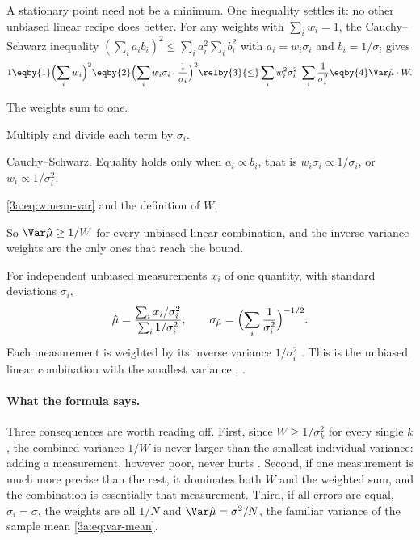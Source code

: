 A stationary point need not be a minimum. One inequality settles it: no
other unbiased linear recipe does better. For any weights with
$\sum_iw_i=1$, the Cauchy--Schwarz inequality
$(\sum_ia_ib_i)^2\le\sum_ia_i^2\sum_ib_i^2$ with $a_i=w_i\sigma_i$ and
$b_i=1/\sigma_i$ gives
\begin{equation}
  1 \eqby{1} \Bigl(\sum_i w_i\Bigr)^2
    \eqby{2} \Bigl(\sum_i w_i\sigma_i\cdot\frac{1}{\sigma_i}\Bigr)^2
    \relby{3}{\le} \sum_iw_i^2\sigma_i^2\;\sum_i\frac{1}{\sigma_i^2}
    \eqby{4} \Var\hat\mu\cdot W .
  \label{3a:eq:wmean-cs}
\end{equation}
\begin{explain}
  \item The weights sum to one.
  \item Multiply and divide each term by $\sigma_i$.
  \item Cauchy--Schwarz. Equality holds only when $a_i\propto b_i$, that is
        $w_i\sigma_i\propto1/\sigma_i$, or $w_i\propto1/\sigma_i^2$.
  \item \eqref{3a:eq:wmean-var} and the definition of $W$.
\end{explain}
So $\Var\hat\mu\ge1/W$ for every unbiased linear combination, and the
inverse-variance weights are the only ones that reach the bound.

\begin{workdef}
For independent unbiased measurements $x_i$ of one quantity, with standard
deviations $\sigma_i$,
\[
  \hat\mu=\frac{\sum_ix_i/\sigma_i^2}{\sum_i1/\sigma_i^2},
  \qquad
  \sigma_{\hat\mu}=\Bigl(\sum_i\frac{1}{\sigma_i^2}\Bigr)^{-1/2}.
\]
Each measurement is weighted by its inverse variance $1/\sigma_i^2$
. This is
the unbiased linear combination with the smallest variance
, .
\end{workdef}

\paragraph{What the formula says.}
Three consequences are worth reading off. First, since
$W\ge1/\sigma_k^2$ for every single $k$, the combined variance $1/W$ is
never larger than the smallest individual variance: adding a measurement,
however poor, never hurts . Second, if one
measurement is much more precise than the rest, it dominates both $W$ and
the weighted sum, and the combination is essentially that measurement.
Third, if all errors are equal, $\sigma_i=\sigma$, the weights are all
$1/N$ and $\Var\hat\mu=\sigma^2/N$, the familiar variance of the sample mean
\eqref{3a:eq:var-mean}.

